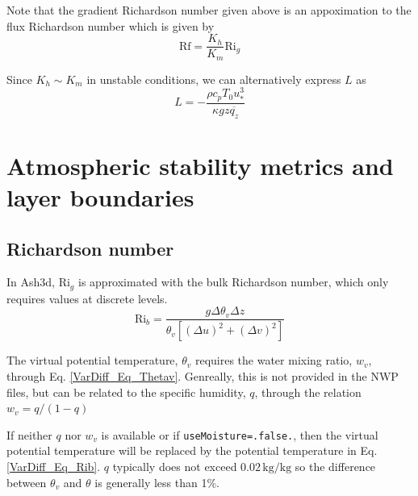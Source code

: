 Note that the gradient Richardson number given above is an appoximation to the flux
Richardson number which is given by
\begin{equation}\label{VarDiff_Eq_Rf}
\mathrm{Rf} = \frac{K_h}{K_m}\mathrm{Ri}_g
\end{equation}

Since $K_h \sim K_m$ in unstable conditions, we can alternatively express $L$ as
\begin{equation}\label{VarDiff_Eq_Lalt}
L = -\frac{\rho c_p T_0 u^3_{*}}{\kappa g z \overline{q_z}} %
\end{equation}



\section{Atmospheric stability metrics and layer boundaries}
\subsection{Richardson number}

In Ash3d, $\mathrm{Ri}_g$ is approximated with the bulk Richardson number, which
only requires values at discrete levels.
\begin{equation}\label{VarDiff_Eq_Rib}
\mathrm{Ri}_b = \frac{g \Delta \theta_v \Delta z}
{\theta_v \left[ \left( \Delta u \right)^2 + \left( \Delta v \right)^2 \right]}
\end{equation}

The virtual potential temperature, $\theta_v$ requires the water mixing ratio, $w_v$,
through Eq. \ref{VarDiff_Eq_Thetav}. Genreally, this is not provided
in the NWP files, but can be related to the specific humidity, $q$, through the relation
$w_v=q/(1-q)$

If neither $q$ nor $w_v$ is available or if \texttt{useMoisture=.false.}, then
the virtual potential temperature will be replaced by the potential temperature in Eq. \ref{VarDiff_Eq_Rib}.
$q$ typically does not exceed $0.02 \, \mathrm{kg}/\mathrm{kg}$ so the difference between $\theta_v$
and $\theta$ is generally less than 1\%.

